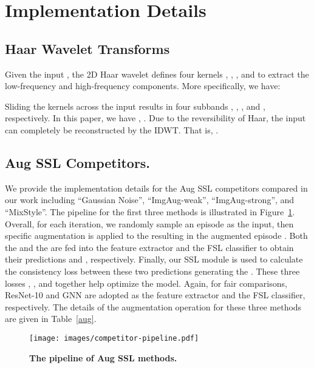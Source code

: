 \documentclass{article}
\begin{document}
\clearpage
\printbibliography





\clearpage
\appendix

\section{Implementation Details}
\subsection{Haar Wavelet Transforms}
Given the input , the 2D Haar wavelet defines four kernels , , , and  to extract the low-frequency and high-frequency components.
More specifically, we have:

Sliding the kernels across the input  results in four subbands , , , and , respectively. In this paper, we have , . Due to the reversibility of Haar, the input  can completely be reconstructed by the IDWT. That is, .







\subsection{Aug  SSL Competitors.}
We provide the implementation details for the Aug  SSL competitors compared in our work including ``Gaussian Noise'', ``ImgAug-weak'', ``ImgAug-strong'', and ``MixStyle''. The pipeline for the first three methods is illustrated in Figure~\ref{fig:pipeline}. Overall, for each iteration, we randomly sample an episode  as the input, then specific augmentation is applied to the  resulting in the augmented episode . Both the  and the  are fed into the feature extractor and the FSL classifier to obtain their predictions  and , respectively. Finally, our SSL module is used to calculate the consistency loss between these two predictions generating the . These three losses , , and  together help optimize the model. Again, for fair comparisons, ResNet-10 and GNN are adopted as the feature extractor and the FSL classifier, respectively. The details of the augmentation operation for these three methods are given in Table~\ref{aug}.

\begin{figure}[h!]
	\centering
\texttt{[image: images/competitor-pipeline.pdf]}
\caption{\textbf{The pipeline of Aug  SSL methods.} }
	\label{fig:pipeline} 
\end{figure}
\end{document}
